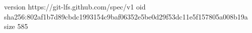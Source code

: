 version https://git-lfs.github.com/spec/v1
oid sha256:802af1b7d89cbdc1993154c9baf06352e5be0d29f53dc11e5f157805a008b19a
size 585
